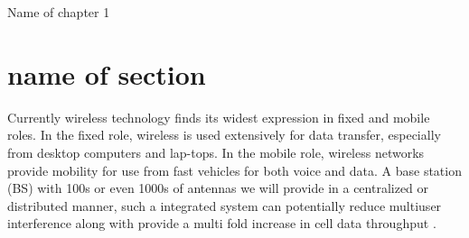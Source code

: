 \begin{chapter}{Name of chapter 1}
\setcounter{secnumdepth}{4}
\label{chap:chap1}
\section{name of section}
Currently wireless \citep{gha} technology finds its widest expression in fixed and mobile roles. In the fixed role, wireless is used extensively for data transfer, especially from desktop computers and lap-tops. In the mobile role, wireless networks provide mobility for use from fast vehicles for both voice and data. A base station (BS) with 100s or even 1000s of antennas we will provide in a centralized or distributed manner, such a integrated system can potentially reduce multiuser interference along with provide a multi fold increase in cell data throughput \cite{wen}. \\
\end{chapter}
